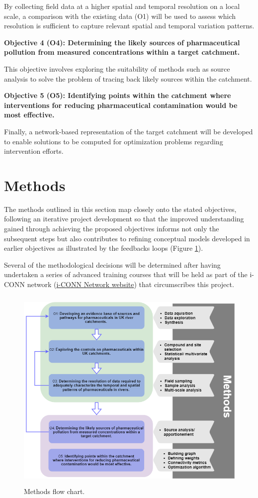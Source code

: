 \documentclass{article}
\begin{document}
By collecting field data at a higher spatial and temporal resolution on a local scale, a comparison with the existing data (O1) will be used to assess which resolution is sufficient to capture relevant spatial and temporal variation patterns.

\vspace{5mm}
\textbf{Objective 4 (O4): Determining the likely sources of pharmaceutical pollution from measured concentrations within a target catchment.}

This objective involves exploring the suitability of methods such as source analysis to solve the problem of tracing back likely sources within the catchment.

\vspace{5mm}
\textbf{Objective 5 (O5): Identifying points within the catchment where interventions for reducing pharmaceutical contamination would be most effective.}

Finally, a network-based representation of the target catchment will be developed to enable solutions to be computed for optimization problems regarding intervention efforts.

\clearpage
\section{Methods}
The methods outlined in this section map closely onto the stated objectives, following an iterative project development so that the improved understanding gained through achieving the proposed objectives informs not only the subsequent steps but also contributes to refining conceptual models developed in earlier objectives as illustrated by the feedbacks loops (Figure \ref{fig_workflow}). 

Several of the methodological decisions will be determined after having undertaken a series of advanced training courses that will be held as part of the i-CONN network  (\href{https://iconn.network/}{i-CONN Network website}) that circumscribes this project.

\begin{figure}[h]
    \centering
    \includegraphics[height=10cm]{fig_workflow.png}
    \caption{Methods flow chart.}
    \label{fig_workflow}
\end{figure}
\end{document}
